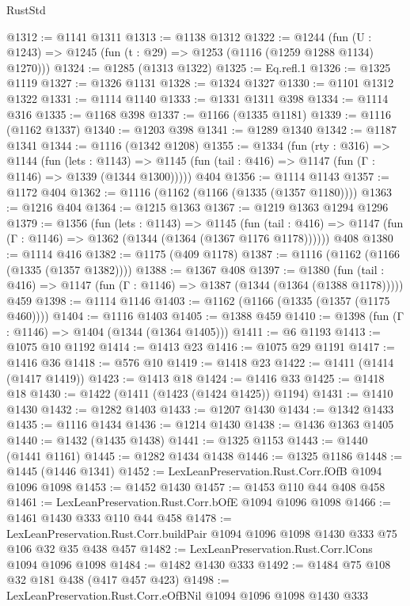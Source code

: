 \begin{lexlean}{RustStd}
\begin{coremodule}
@1312 := @1141 @1311
@1313 := @1138 @1312
@1322 := @1244 (fun (U : @1243) => @1245 (fun (t : @29) => @1253 (@1116 (@1259 @1288 @1134) @1270)))
@1324 := @1285 (@1313 @1322)
@1325 := Eq.refl.{1}
@1326 := @1325 @1119
@1327 := @1326 @1131
@1328 := @1324 @1327
@1330 := @1101 @1312 @1322
@1331 := @1114 @1140
@1333 := @1331 @1311 @398
@1334 := @1114 @316
@1335 := @1168 @398
@1337 := @1166 (@1335 @1181)
@1339 := @1116 (@1162 @1337)
@1340 := @1203 @398
@1341 := @1289 @1340
@1342 := @1187 @1341
@1344 := @1116 (@1342 @1208)
@1355 := @1334
    (fun (rty : @316) =>
    @1144
      (fun (lets : @1143) =>
      @1145 (fun (tail : @416) => @1147 (fun (Γ : @1146) => @1339 (@1344 @1300)))))
    @404
@1356 := @1114 @1143
@1357 := @1172 @404
@1362 := @1116 (@1162 (@1166 (@1335 (@1357 @1180))))
@1363 := @1216 @404
@1364 := @1215 @1363
@1367 := @1219 @1363 @1294 @1296
@1379 := @1356
    (fun (lets : @1143) =>
    @1145
      (fun (tail : @416) => @1147 (fun (Γ : @1146) => @1362 (@1344 (@1364 (@1367 @1176 @1178))))))
    @408
@1380 := @1114 @416
@1382 := @1175 (@409 @1178)
@1387 := @1116 (@1162 (@1166 (@1335 (@1357 @1382))))
@1388 := @1367 @408
@1397 := @1380
    (fun (tail : @416) => @1147 (fun (Γ : @1146) => @1387 (@1344 (@1364 (@1388 @1178)))))
    @459
@1398 := @1114 @1146
@1403 := @1162 (@1166 (@1335 (@1357 (@1175 @460))))
@1404 := @1116 @1403
@1405 := @1388 @459
@1410 := @1398 (fun (Γ : @1146) => @1404 (@1344 (@1364 @1405)))
@1411 := @6 @1193
@1413 := @1075 @10 @1192
@1414 := @1413 @23
@1416 := @1075 @29 @1191
@1417 := @1416 @36
@1418 := @576 @10
@1419 := @1418 @23
@1422 := @1411 (@1414 (@1417 @1419))
@1423 := @1413 @18
@1424 := @1416 @33
@1425 := @1418 @18
@1430 := @1422 (@1411 (@1423 (@1424 @1425)) @1194)
@1431 := @1410 @1430
@1432 := @1282 @1403
@1433 := @1207 @1430
@1434 := @1342 @1433
@1435 := @1116 @1434
@1436 := @1214 @1430
@1438 := @1436 @1363 @1405
@1440 := @1432 (@1435 @1438)
@1441 := @1325 @1153
@1443 := @1440 (@1441 @1161)
@1445 := @1282 @1434 @1438
@1446 := @1325 @1186
@1448 := @1445 (@1446 @1341)
@1452 := LexLeanPreservation.Rust.Corr.fOfB @1094 @1096 @1098
@1453 := @1452 @1430
@1457 := @1453 @110 @44 @408 @458
@1461 := LexLeanPreservation.Rust.Corr.bOfE @1094 @1096 @1098
@1466 := @1461 @1430 @333 @110 @44 @458
@1478 := LexLeanPreservation.Rust.Corr.buildPair
    @1094
    @1096
    @1098
    @1430
    @333
    @75
    @106
    @32
    @35
    @438
    @457
@1482 := LexLeanPreservation.Rust.Corr.lCons @1094 @1096 @1098
@1484 := @1482 @1430 @333
@1492 := @1484 @75 @108 @32 @181 @438 (@417 @457 @423)
@1498 := LexLeanPreservation.Rust.Corr.eOfBNil @1094 @1096 @1098 @1430 @333

\end{coremodule}
\end{lexlean}
